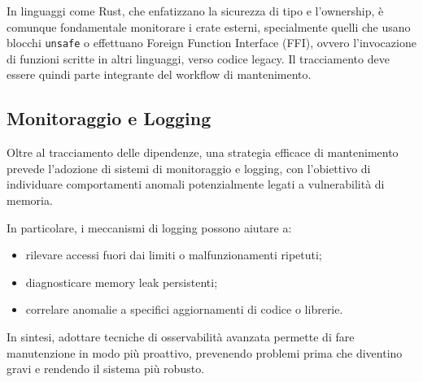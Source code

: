 In linguaggi come Rust, che enfatizzano la sicurezza di tipo e l'ownership, è comunque
fondamentale monitorare i crate esterni, specialmente quelli che usano blocchi
\texttt{unsafe} o effettuano Foreign Function Interface (FFI), ovvero l'invocazione
di funzioni scritte in altri linguaggi, verso codice legacy. Il tracciamento
deve essere quindi parte integrante del workflow di mantenimento.

\subsection{Monitoraggio e Logging}
\label{sec:monitoraggio-logging}

Oltre al tracciamento delle dipendenze, una strategia efficace di mantenimento
prevede l'adozione di sistemi di monitoraggio e logging, con l'obiettivo di individuare
comportamenti anomali potenzialmente legati a vulnerabilità di memoria.

In particolare, i meccanismi di logging possono aiutare a:
\begin{itemize}
  \item rilevare accessi fuori dai limiti o malfunzionamenti ripetuti;

  \item diagnosticare memory leak persistenti;

  \item correlare anomalie a specifici aggiornamenti di codice o librerie.
\end{itemize}

In sintesi, adottare tecniche di osservabilità avanzata permette di fare manutenzione
in modo più proattivo, prevenendo problemi prima che diventino gravi e rendendo
il sistema più robusto.
